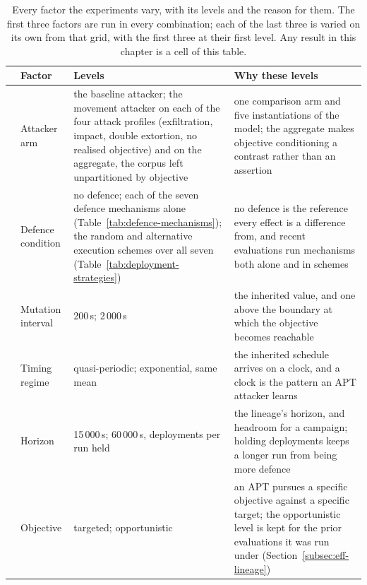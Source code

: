 \begin{table}[htbp]
  \centering
  \caption[The experimental factors and their levels]{Every factor the experiments vary, with its levels and the reason for them. The first three factors are run in every combination; each of the last three is varied on its own from that grid, with the first three at their first level. Any result in this chapter is a cell of this table.}
  \label{tab:factors-varied}
  \tablestyle\setlength{\tabcolsep}{4pt}
  \begin{tabular}{@{}cP{2.4cm}P{5.2cm}P{6.5cm}@{}}
    \toprule
    & Factor & Levels & Why these levels \\
    \midrule
    & Attacker arm & the baseline attacker; the movement attacker on each of the four attack profiles (exfiltration, impact, double extortion, no realised objective) and on the aggregate, the corpus left unpartitioned by objective & one comparison arm and five instantiations of the model; the aggregate makes objective conditioning a contrast rather than an assertion \\
    & Defence condition & no defence; each of the seven defence mechanisms alone (Table~\ref{tab:defence-mechanisms}); the random and alternative execution schemes over all seven (Table~\ref{tab:deployment-strategies}) & no defence is the reference every effect is a difference from, and recent evaluations run mechanisms both alone and in schemes \\
     & Mutation interval & 200\,s; 2\,000\,s & the inherited value, and one above the boundary at which the objective becomes reachable \\
    \midrule
    & Timing regime & quasi-periodic; exponential, same mean & the inherited schedule arrives on a clock, and a clock is the pattern an APT attacker learns \citep{jalowski2026} \\
    & Horizon & 15\,000\,s; 60\,000\,s, deployments per run held & the lineage's horizon, and headroom for a campaign; holding deployments keeps a longer run from being more defence \\
     & Objective & targeted; opportunistic & an APT pursues a specific objective against a specific target; the opportunistic level is kept for the prior evaluations it was run under (Section~\ref{subsec:eff-lineage}) \\
    \bottomrule
  \end{tabular}
\end{table}

